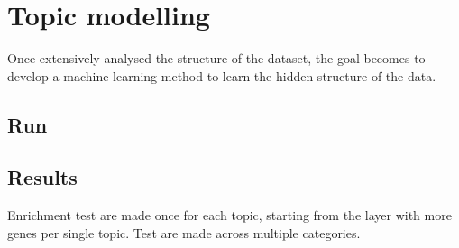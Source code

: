 \chapter{Topic modelling}\label{ch:topicmodelling}
Once extensively analysed the structure of the dataset, the goal becomes to develop a machine learning method to learn the hidden structure of the data.









\clearpage
\section{Run}


\clearpage


\clearpage


\section{Results}


Enrichment test are made once for each topic, starting from the layer with more genes per 
single topic. Test are made across multiple categories.
